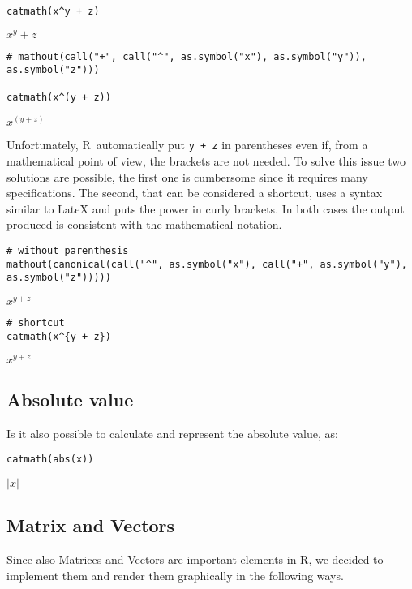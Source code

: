 \begin{verbatim}
catmath(x^y + z)
\end{verbatim}

\({{{{x}}^{{y}}}+{z}}\)

\begin{verbatim}
# mathout(call("+", call("^", as.symbol("x"), as.symbol("y")), as.symbol("z")))

catmath(x^(y + z))
\end{verbatim}

\({{{x}}^{\left({{y}+{z}}\right)}}\)

Unfortunately, R~automatically put \texttt{y\ +\ z} in parentheses even if, from a mathematical point of view, the brackets are not needed. To solve this issue two solutions are possible, the first one is cumbersome since it requires many specifications. The second, that can be considered a shortcut, uses a syntax similar to LateX and puts the power in curly brackets. In both cases the output produced is consistent with the mathematical notation.

\begin{verbatim}
# without parenthesis
mathout(canonical(call("^", as.symbol("x"), call("+", as.symbol("y"), as.symbol("z")))))
\end{verbatim}

\({{{x}}^{{{y}+{z}}}}\)

\begin{verbatim}
# shortcut
catmath(x^{y + z})
\end{verbatim}

\({{{x}}^{{{y}+{z}}}}\)

\hypertarget{absolute-value}{%
\subsection{Absolute value}\label{absolute-value}}

Is it also possible to calculate and represent the absolute value, as:

\begin{verbatim}
catmath(abs(x))
\end{verbatim}

\(\left|{{x}}\right|\)

\hypertarget{matrix-and-vectors}{%
\subsection{Matrix and Vectors}\label{matrix-and-vectors}}

Since also Matrices and Vectors are important elements in R, we decided to implement them and render them graphically in the following ways.

